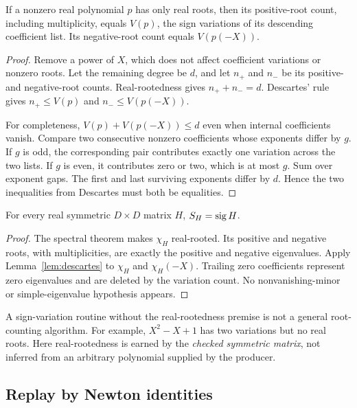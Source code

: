 \begin{lemma}\label{lem:descartes}
If a nonzero real polynomial $p$ has only real roots, then its positive-root count, including multiplicity, equals $V(p)$, the sign variations of its descending coefficient list. Its negative-root count equals $V(p(-X))$.
\end{lemma}
\begin{proof}
Remove a power of $X$, which does not affect coefficient variations or nonzero roots. Let the remaining degree be $d$, and let $n_+$ and $n_-$ be its positive- and negative-root counts. Real-rootedness gives $n_++n_-=d$. Descartes' rule gives $n_+\leq V(p)$ and $n_-\leq V(p(-X))$.

For completeness, $V(p)+V(p(-X))\leq d$ even when internal coefficients vanish. Compare two consecutive nonzero coefficients whose exponents differ by $g$. If $g$ is odd, the corresponding pair contributes exactly one variation across the two lists. If $g$ is even, it contributes zero or two, which is at most $g$. Sum over exponent gaps. The first and last surviving exponents differ by $d$. Hence the two inequalities from Descartes must both be equalities.
\end{proof}

\begin{theorem}\label{thm:signature}
For every real symmetric $D\times D$ matrix $H$, $S_H=\operatorname{sig} H$.
\end{theorem}
\begin{proof}
The spectral theorem makes $\chi_H$ real-rooted. Its positive and negative roots, with multiplicities, are exactly the positive and negative eigenvalues. Apply Lemma~\ref{lem:descartes} to $\chi_H$ and $\chi_H(-X)$. Trailing zero coefficients represent zero eigenvalues and are deleted by the variation count. No nonvanishing-minor or simple-eigenvalue hypothesis appears.
\end{proof}

A sign-variation routine without the real-rootedness premise is not a general root-counting algorithm. For example, $X^2-X+1$ has two variations but no real roots. Here real-rootedness is earned by the \emph{checked symmetric matrix}, not inferred from an arbitrary polynomial supplied by the producer.

\subsection{Replay by Newton identities}

